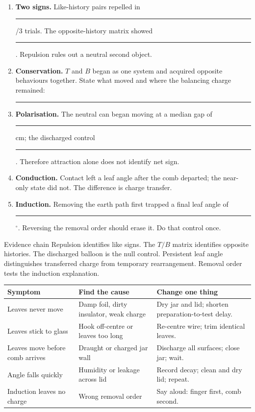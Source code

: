 \newpage
{}

\begin{enumerate}
\item \textbf{Two signs.} Like-history pairs repelled in
  \rule{.8cm}{.3pt}/3 trials. The opposite-history matrix showed
  \rule{2.2cm}{.3pt}. Repulsion rules out a neutral second object.
\item \textbf{Conservation.} \(T\) and \(B\) began as one system and acquired
  opposite behaviours together. State what moved and where the balancing
  charge remained: \rule{.48\linewidth}{.3pt}
\item \textbf{Polarisation.} The neutral can began moving at a median gap of
  \rule{.8cm}{.3pt} cm; the discharged control \rule{1.8cm}{.3pt}. Therefore
  attraction alone does not identify net sign.
\item \textbf{Conduction.} Contact left a leaf angle after the comb departed;
  the near-only state did not. The difference is charge transfer.
\item \textbf{Induction.} Removing the earth path first trapped a final leaf
  angle of \rule{.8cm}{.3pt}\(^\circ\). Reversing the removal order should erase
  it. Do that control once.
\end{enumerate}

\begin{telospanel}{Evidence chain}
Repulsion identifies like signs. The \(T/B\) matrix identifies opposite
histories. The discharged balloon is the null control. Persistent leaf angle
distinguishes transferred charge from temporary rearrangement. Removal order
tests the induction explanation.
\end{telospanel}


\begin{tabularx}{\linewidth}{@{}p{.23\linewidth}L L@{}}
\toprule
Symptom & Find the cause & Change one thing\\
\midrule
Leaves never move & Damp foil, dirty insulator, weak charge & Dry jar and lid;
shorten preparation-to-test delay.\\
Leaves stick to glass & Hook off-centre or leaves too long & Re-centre wire;
trim identical leaves.\\
Leaves move before comb arrives & Draught or charged jar wall & Discharge all
surfaces; close jar; wait.\\
Angle falls quickly & Humidity or leakage across lid & Record decay; clean and
dry lid; repeat.\\
Induction leaves no charge & Wrong removal order & Say aloud: finger first,
comb second.\\
\bottomrule
\end{tabularx}

